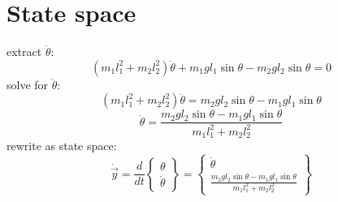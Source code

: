 \documentclass[titlepage]{article}
\numberwithin{equation}{section}
\begin{document}
\section{State space}
extract $\ddot{\theta}$:
\begin{equation}
(m_1 l_1^2 + m_2 l_2^2)\ddot{\theta} + m_1 g l_1 \sin \theta - m_2 g l_2 \sin \theta = 0
\end{equation}
solve for $\ddot{\theta}$:
\begin{equation}
(m_1 l_1^2 + m_2 l_2^2)\ddot{\theta} = m_2 g l_2 \sin \theta - m_1 g l_1 \sin \theta
\end{equation}
\begin{equation}
\ddot{\theta} = \frac{m_2 g l_2 \sin \theta - m_1 g l_1 \sin \theta}{m_1 l_1^2 + m_2 l_2^2}
\end{equation}
rewrite as state space:
\begin{equation}
\dot{\overrightarrow{y}} = \frac{d}{dt}
\left\{\!
\begin{array}{c}
  \theta \\
  \dot{\theta}
\end{array}
\!\right\} = 
\left\{\!
\begin{array}{c}
  \dot{\theta} \\
  \frac{m_2 g l_2 \sin \theta - m_1 g l_1 \sin \theta}{m_1 l_1^2 + m_2 l_2^2}
\end{array}
\!\right\}
\end{equation}
\end{document}
